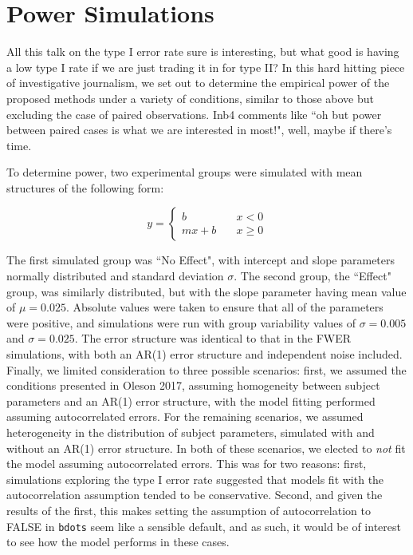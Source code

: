 \documentclass{article}
\newcommand{\xt}{\texttt}
\begin{document}
\section{Power Simulations}



All this talk on the type I error rate sure is interesting, but what good is having a low type I rate if we are just trading it in for type II? In this hard hitting piece of investigative journalism, we set out to determine the empirical power of the proposed methods under a variety of conditions, similar to those above but excluding the case of paired observations. Inb4 comments like ``oh but power between paired cases is what we are interested in most!", well, maybe if there's time.

To determine power, two experimental groups were simulated with mean structures of the following form:

\begin{equation}\label{eq:piecewise_form}
y = \begin{cases}
b \quad &x < 0 \\
mx + b \quad &x \geq 0
\end{cases}
\end{equation}

The first simulated group was ``No Effect", with intercept and slope parameters normally distributed and standard deviation $\sigma$. The second group, the ``Effect" group, was similarly distributed, but with the slope parameter having mean value of $\mu = 0.025$. Absolute values were taken to ensure that all of the parameters were positive, and simulations were run with group variability values of $\sigma = 0.005$ and $\sigma = 0.025$. The error structure was identical to that in the FWER simulations, with both an AR(1) error structure and independent noise included. Finally, we limited consideration to three possible scenarios: first, we assumed the conditions presented in Oleson 2017, assuming homogeneity between subject parameters and an AR(1) error structure, with the model fitting performed assuming autocorrelated errors. For the remaining scenarios, we assumed heterogeneity in the distribution of subject parameters, simulated with and without an AR(1) error structure. In both of these scenarios, we elected to \textit{not} fit the model assuming autocorrelated errors. This was for two reasons: first, simulations exploring the type I error rate suggested that models fit with the autocorrelation assumption tended to be conservative. Second, and given the results of the first, this makes setting the assumption of autocorrelation to FALSE in \xt{bdots} seem like a sensible default, and as such, it would be of interest to see how the model performs in these cases.
\end{document}
